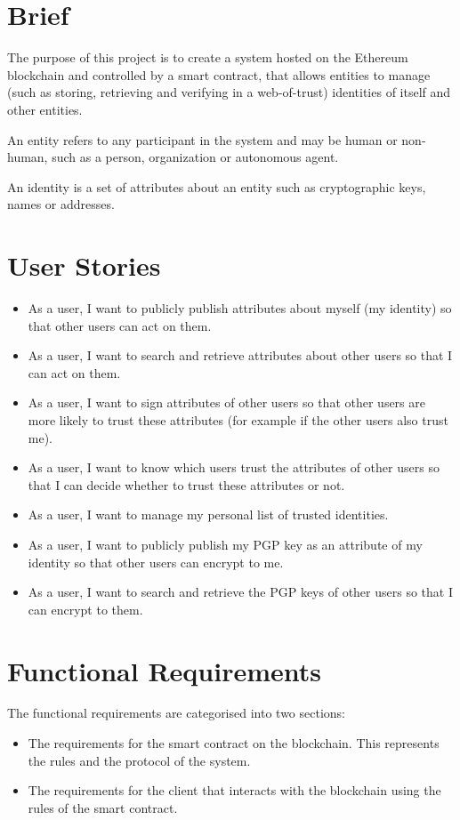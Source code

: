 \documentclass[12pt]{report}
\begin{document}
	\section{Brief}
	The purpose of this project is to create a system hosted on the Ethereum blockchain and controlled by a smart contract, that allows entities to manage (such as storing, retrieving and verifying in a web-of-trust) identities of itself and other entities.
	
	An entity refers to any participant in the system and may be human or non-human, such as a person, organization or autonomous agent.
	
	An identity is a set of attributes about an entity such as cryptographic keys, names or addresses.
	
	\section{User Stories}
	\begin{itemize}
		\item As a user, I want to publicly publish attributes about myself (my identity) so that other users can act on them.
		\item As a user, I want to search and retrieve attributes about other users so that I can act on them.
		\item As a user, I want to sign attributes of other users so that other users are more likely to trust these attributes (for example if the other users also trust me).
		\item As a user, I want to know which users trust the attributes of other users so that I can decide whether to trust these attributes or not.
		\item As a user, I want to manage my personal list of trusted identities.
		\item As a user, I want to publicly publish my PGP key as an attribute of my identity so that other users can encrypt to me.
		\item As a user, I want to search and retrieve the PGP keys of other users so that I can encrypt to them.
	\end{itemize}
	
	\section{Functional Requirements}
	The functional requirements are categorised into two sections:
	\begin{itemize}
		\item The requirements for the smart contract on the blockchain. This represents the rules and the protocol of the system.
		\item The requirements for the client that interacts with the blockchain using the rules of the smart contract.
	\end{itemize}		
	
\end{document}
